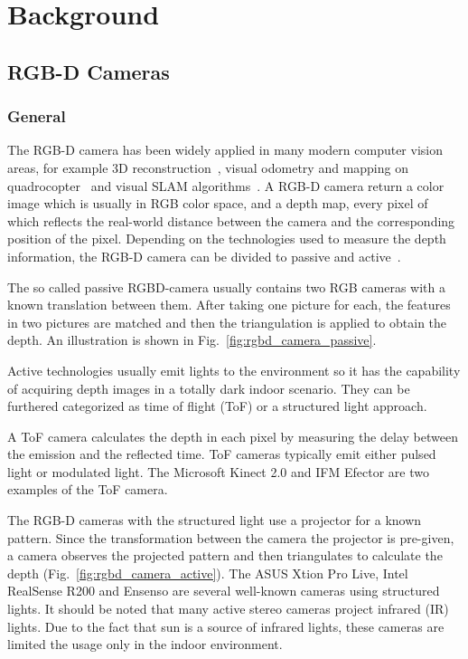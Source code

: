 \chapter{Background} \label{chap:background}
\section{RGB-D Cameras}

\subsection{General}
The RGB-D camera has been widely applied in many modern computer vision areas, for example 3D reconstruction~\cite{newcombe2011kinectfusion}, visual odometry and mapping on quadrocopter~\cite{huang2017visual} and visual SLAM algorithms~\cite{engelhard2011real}. 
A RGB-D camera return a color image which is usually in RGB color space, and a depth map, every pixel of which reflects the real-world distance between the camera and the corresponding position of the pixel.
Depending on the technologies used to measure the depth information, the RGB-D camera can be divided to passive and active~\cite{kerl2012msc}.

The so called passive RGBD-camera usually contains two RGB cameras with a known translation between them.
After taking one picture for each, the features in two pictures are matched and then the triangulation is applied to obtain the depth.
An illustration is shown in Fig.~\ref{fig:rgbd_camera_passive}.

Active technologies usually emit lights to the environment so it has the capability of acquiring depth images in a totally dark indoor scenario.
They can be furthered categorized as time of flight (ToF) or a structured light approach.

A ToF camera calculates the depth in each pixel by measuring the delay between the emission and the reflected time.
ToF cameras typically emit either pulsed light or modulated light.
The Microsoft Kinect 2.0 and IFM Efector are two examples of the ToF camera.

The RGB-D cameras with the structured light use a projector for a known pattern. 
Since the transformation between the camera the projector is pre-given, a camera observes the projected pattern and then triangulates to calculate the depth (Fig.~\ref{fig:rgbd_camera_active}).
The ASUS Xtion Pro Live, Intel RealSense R200 and Ensenso are several well-known cameras using structured lights.
It should be noted that many active stereo cameras project infrared (IR) lights. 
Due to the fact that sun is a source of infrared lights, these cameras are limited the usage only in the indoor environment.


